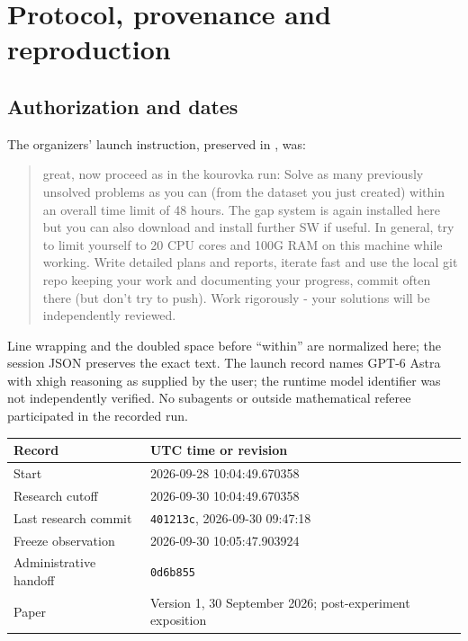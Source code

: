 \section{Protocol, provenance and reproduction}\label{app:protocol}

\subsection{Authorization and dates}
The organizers' launch instruction, preserved in
, was:
\begin{quote}\small
great, now proceed as in the kourovka run: Solve as many previously
unsolved problems as you can (from the dataset you just created) within
an overall time limit of 48 hours. The gap system is again installed
here but you can also download and install further SW if useful. In
general, try to limit yourself to 20 CPU cores and 100G RAM on this
machine while working. Write detailed plans and reports, iterate fast
and use the local git repo keeping your work and documenting your
progress, commit often there (but don't try to push). Work rigorously -
your solutions will be independently reviewed.
\end{quote}
Line wrapping and the doubled space before ``within'' are normalized
here; the session JSON preserves the exact text. The launch record names
GPT-6 Astra with xhigh reasoning as supplied by the user; the runtime
model identifier was not independently verified. No subagents or
outside mathematical referee participated in the recorded run.

\begin{center}\small
\begin{tabular}{@{}lp{}@{}}
\toprule Record & UTC time or revision \\\midrule
Start & 2026-09-28 10:04:49.670358\\
Research cutoff & 2026-09-30 10:04:49.670358\\
Last research commit & \texttt{401213c}, 2026-09-30 09:47:18\\
Freeze observation & 2026-09-30 10:05:47.903924\\
Administrative handoff & \texttt{0d6b855}\\
Paper & Version 1, 30 September 2026; post-experiment exposition\\
\bottomrule
\end{tabular}
\end{center}

